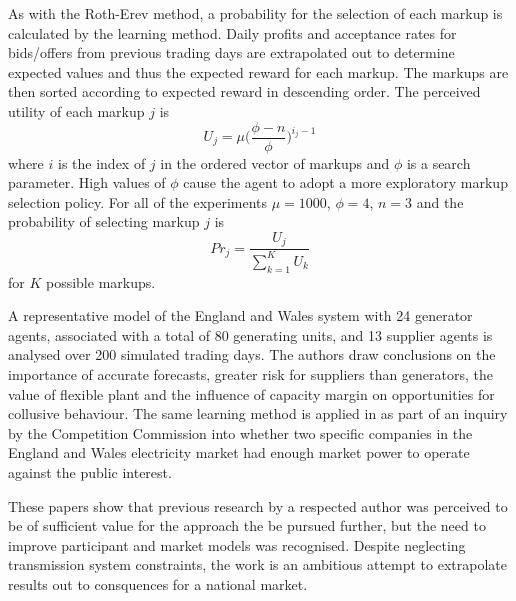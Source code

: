 As with the Roth-Erev method, a probability for the selection of each markup is
calculated by the learning method.  Daily profits and acceptance rates for
bids/offers from previous trading days are extrapolated out to determine
expected values and thus the expected reward for each markup.  The markups are then
sorted according to expected reward in descending order.  The perceived utility
of each markup $j$ is
\begin{equation}
U_j = \mu \biggl(\frac{\phi - n}{\phi}\biggr)^{i_j-1}
\end{equation}
where $i$ is the index of $j$ in the ordered vector of markups and $\phi$ is a
search parameter.  High values of $\phi$ cause the agent to adopt a more
exploratory markup selection policy.  For all of the experiments $\mu = 1000$,
$\phi = 4$, $n = 3$ and the probability of selecting markup $j$ is
\begin{equation}
Pr_j = \frac{U_j}{\sum_{k=1}^K U_k}
\end{equation}
for $K$ possible markups.

A representative model of the England and Wales system with 24 generator
agents, associated with a total of 80 generating units, and 13 supplier agents
is analysed over 200 simulated trading days.  The authors draw conclusions on
the importance of accurate forecasts, greater risk for suppliers than
generators, the value of flexible plant and the influence of capacity margin on opportunities
for collusive behaviour.
The same learning method is applied in  as part of an
inquiry by the Competition Commission into whether two specific companies in the
England and Wales electricity market had enough market power to operate against
the public interest.

These papers show that previous research by a respected author was perceived
to be of sufficient value for the approach the be pursued further, but the need
to improve participant and market models was recognised.  Despite neglecting
transmission system constraints, the work is an ambitious attempt to
extrapolate results out to consquences for a national market.

